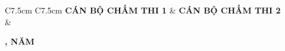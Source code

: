 \begin{titlepage}
\vspace{0.9cm}

\begingroup
\singlespacing
\fontsize{13pt}{16pt}\selectfont
\begin{tabular}{C{7.5cm} C{7.5cm}}
\textbf{CÁN BỘ CHẤM THI 1} & \textbf{CÁN BỘ CHẤM THI 2} \\[1.6cm]
\textbf{\GiangVienHD} & \\
\end{tabular}
\endgroup

\vfill

{\bfseries\fontsize{14pt}{17pt}\selectfont \DiaDiem, NĂM \Nam \par}

\end{titlepage}
